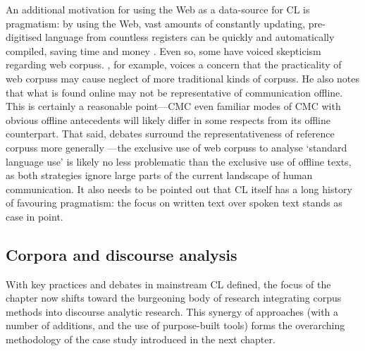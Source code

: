 An additional motivation for using the Web as a data\hyp{}source for \gls{CL} is pragmatism: by using the Web, vast amounts of constantly updating, pre\hyp{}digitised language from countless registers can be quickly and automatically compiled, saving time and money \cite{baroni_wacky_2009}. Even so, some have voiced skepticism regarding web \glspl{corpus}. \textcite{leech_new_2006}, for example, voices a concern that the practicality of web \glspl{corpus} may cause neglect of more traditional kinds of \glspl{corpus}. He also notes that what is found online may not be representative of communication offline. This is certainly a reasonable point---\gls{CMC} even familiar \glspl{mode} of \gls{CMC} with obvious offline antecedents will likely differ in some respects from its offline counterpart. That said, debates surround the representativeness of reference \glspl{corpus} more generally \cite{baker_acceptable_2012}---the exclusive use of web \glspl{corpus} to analyse `standard language use' is likely no less problematic than the exclusive use of offline texts, as both strategies ignore large parts of the current landscape of human communication. It also needs to be pointed out that \gls{CL} itself has a long history of favouring pragmatism: the focus on written text over spoken text \cite[with even contemporary general \glspl{corpus} such as the BNC containing 90 per cent written text due to the expense associated with transcription---see][]{bnc_reference_2016,leech1992100} stands as case in point.


\subsection{Corpora and discourse analysis} \label{sect:cads}

With key practices and debates in mainstream \gls{CL} defined, the focus of the chapter now shifts toward the burgeoning body of research integrating corpus methods into discourse analytic research. This synergy of approaches (with a number of additions, and the use of purpose-built tools) forms the overarching methodology of the case study introduced in the next chapter.

